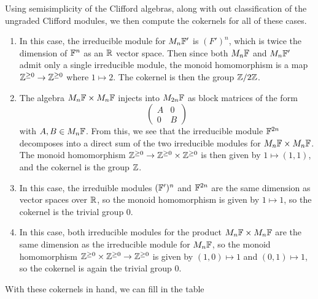 %
Using semisimplicity of the Clifford algebras, along with out classification of
the ungraded Clifford modules, we then compute the cokernels for all of these
cases.
%
\begin{enumerate}
  \item In this case, the irreducible module for $M_n\mathbb{F}'$ is $(F')^n$, which is
  twice the dimension of $\mathbb{F}^n$ as an $\mathbb{R}$ vector space. Then since both
  $M_n\mathbb{F}$ and $M_n\mathbb{F}'$ admit only a single irreducible module, the monoid homomorphism
  is a map $\mathbb{Z}^{\geq 0} \to \mathbb{Z}^{\geq 0}$ where $1 \mapsto 2$. The cokernel is then
  the group $\mathbb{Z}/2\mathbb{Z}$.
  \item The algebra $M_n\mathbb{F} \times M_n\mathbb{F}$ injects into $M_{2n}\mathbb{F}$ as block matrices
  of the form
  \[
  \begin{pmatrix}
  A & 0 \\
  0 & B
  \end{pmatrix}
  \]
  with $A,B \in M_n\mathbb{F}$. From this, we see that the irreducible module $\mathbb{F}^{2n}$
  decomposes into a direct sum of the two irreducible modules for $M_n\mathbb{F} \times M_n\mathbb{F}$.
  The monoid homomorphism $\mathbb{Z}^{\geq 0} \to \mathbb{Z}^{\geq 0} \times \mathbb{Z}^{\geq 0}$ is
  then given by $1 \mapsto (1,1)$, and the cokernel is the group $\mathbb{Z}$.
  \item In this case, the irreduible modules $(\mathbb{F}')^n$ and $\mathbb{F}^{2n}$ are the
  same dimension as vector spaces over $\mathbb{R}$, so the monoid homomorphism is given
  by $1\mapsto 1$, so the cokernel is the trivial group $0$.
  \item In this case, both irreducible modules for the product $M_n\mathbb{F} \times M_n\mathbb{F}$
  are the same dimension as the irreducible module for $M_n\mathbb{F}$, so the monoid homomorphism
  $\mathbb{Z}^{\geq 0 }\times \mathbb{Z}^{\geq 0} \to \mathbb{Z}^{\geq 0}$ is given by $(1,0) \mapsto 1$
  and $(0,1) \mapsto 1$, so the cokernel is again the trivial group $0$.
\end{enumerate}
%
With these cokernels in hand, we can fill in the table \\\\
%
